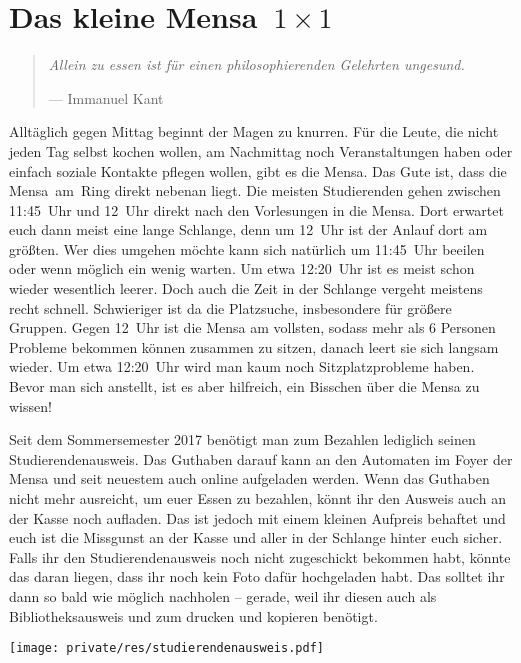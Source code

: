 \section[Das kleine Mensa~1~×~1]{\boldmath Das kleine Mensa~${1 \times 1}$}
\begin{multicols}{2}
\begin{quote}
	\textit{Allein zu essen ist für einen philosophierenden Gelehrten ungesund.}
	
	\hfill--- Immanuel Kant
\end{quote}

Alltäglich gegen Mittag beginnt der Magen zu knurren.
Für die Leute, die nicht jeden Tag selbst kochen wollen, am Nachmittag noch Veranstaltungen haben oder einfach soziale Kontakte pflegen wollen, gibt es die Mensa.
Das Gute ist, dass die Mensa~am~Ring direkt nebenan liegt.
Die meisten Studierenden gehen zwischen 11:45~Uhr und 12~Uhr direkt nach den Vorlesungen in die Mensa.
Dort erwartet euch dann meist eine lange Schlange, denn um 12~Uhr ist der Anlauf dort am größten. Wer dies umgehen möchte kann sich natürlich um 11:45~Uhr beeilen oder wenn möglich ein wenig warten. Um etwa 12:20~Uhr ist es meist schon wieder wesentlich leerer.
Doch auch die Zeit in der Schlange vergeht meistens recht schnell. Schwieriger ist da die Platzsuche, insbesondere für größere Gruppen. Gegen 12~Uhr ist die Mensa am vollsten, sodass mehr als 6 Personen Probleme bekommen können zusammen zu sitzen, danach leert sie sich langsam wieder. Um etwa 12:20~Uhr wird man kaum noch Sitzplatzprobleme haben.
Bevor man sich anstellt, ist es aber hilfreich, ein Bisschen über die Mensa zu wissen!

Seit dem Sommersemester 2017 benötigt man zum Bezahlen lediglich seinen Studierendenausweis.
Das Guthaben darauf kann an den Automaten im Foyer der Mensa und seit neuestem auch online aufgeladen werden.
Wenn das Guthaben nicht mehr ausreicht, um euer Essen zu bezahlen, könnt ihr den Ausweis auch an der Kasse noch aufladen. 
Das ist jedoch mit einem kleinen Aufpreis behaftet und euch ist die Missgunst an der Kasse und aller in der Schlange hinter euch sicher.
Falls ihr den Studierendenausweis noch nicht zugeschickt bekommen habt, könnte das daran liegen, dass ihr noch kein Foto dafür hochgeladen habt.
Das solltet ihr dann so bald wie möglich nachholen -- gerade, weil ihr diesen auch als Bibliotheksausweis und zum drucken und kopieren benötigt.

 \begin{center}
 	\texttt{[image: private/res/studierendenausweis.pdf]}
 \end{center}


\end{multicols}
